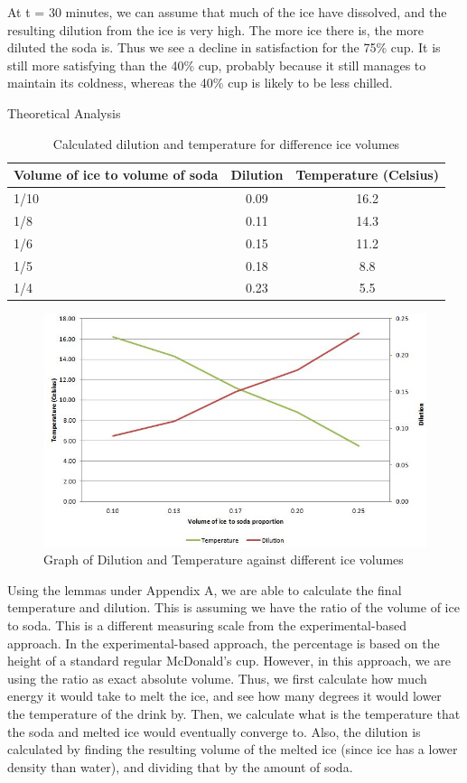 \documentclass[oneside,12pt]{report}
\begin{document}
\vspace{6pt}
At t = 30 minutes, we can assume that much of the ice have dissolved, and the resulting dilution from the ice is very high. The more ice there is, the more diluted the soda is. Thus we see a decline in satisfaction for the 75\% cup. It is still more satisfying than the 40\% cup, probably because it still manages to maintain its coldness, whereas the 40\% cup is likely to be less chilled. 


\newpage
Theoretical Analysis

\begin{table}[ h]
\centering
\begin{tabular}{ l || c|c}
 Volume of ice to volume of soda &Dilution &Temperature (Celsius) \\
\hline  
1/10 & 0.09&16.2\\ 
\hline  
1/8 & 0.11&14.3\\ 
\hline 
1/6 & 0.15&11.2\\ 
\hline 
1/5 & 0.18&8.8\\ 
\hline 
1/4 & 0.23&5.5\\ 
\hline    
\end{tabular}
\caption{Calculated dilution and temperature for difference ice volumes}
\end{table}

\begin{figure}
	\centering
	\caption{Graph of Dilution and Temperature against different ice volumes}
	\includegraphics[width=\textwidth]{extra/Graph.jpg}
\end{figure}

\vspace{12pt}
Using the lemmas under Appendix A, we are able to calculate the final temperature and dilution. This is assuming we have the ratio of the volume of ice to soda. This is a different measuring scale from the experimental-based approach. In the experimental-based approach, the percentage is based on the height of a standard regular McDonald's cup. However, in this approach, we are using the ratio as exact absolute volume. Thus, we first calculate how much energy it would take to melt the ice, and see how many degrees it would lower the temperature of the drink by. Then, we calculate what is the temperature that the soda and melted ice would eventually converge to. Also, the dilution is calculated by finding the resulting volume of the melted ice (since ice has a lower density than water), and dividing that by the amount of soda.
\end{document}
